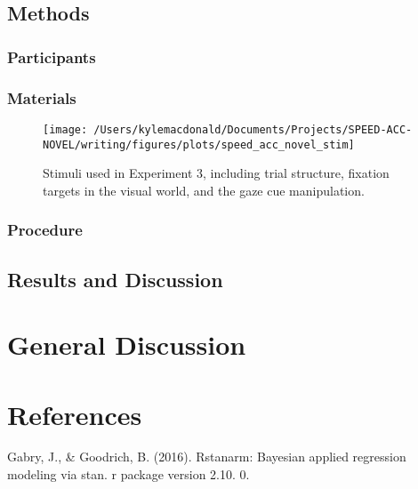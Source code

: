 \documentclass[man,floatsintext]{apa6}
\theoremstyle{definition}
\theoremstyle{definition}
\theoremstyle{definition}
\theoremstyle{remark}
\begin{document}
\subsection{Methods}\label{methods-2}

\subsubsection{Participants}\label{participants-2}

\subsubsection{Materials}\label{materials-2}

\begin{figure}[!t]

{\centering \texttt{[image: /Users/kylemacdonald/Documents/Projects/SPEED-ACC-NOVEL/writing/figures/plots/speed\_acc\_novel\_stim]} 

}

\caption{Stimuli used in Experiment 3, including trial structure, fixation targets in the visual world, and the gaze cue manipulation.}\label{fig:speed-acc-novel-stimuli}
\end{figure}

\subsubsection{Procedure}\label{procedure-2}

\subsection{Results and Discussion}\label{results-and-discussion-2}

\section{General Discussion}\label{general-discussion}

\newpage

\section{References}\label{references}

\begingroup
\setlength{\parindent}{-0.5in} \setlength{\leftskip}{0.5in}

\hypertarget{refs}{}
\hypertarget{ref-gabry2016rstanarm}{}
Gabry, J., \& Goodrich, B. (2016). Rstanarm: Bayesian applied regression
modeling via stan. r package version 2.10. 0.
\end{document}
